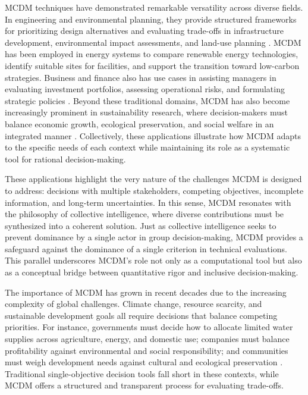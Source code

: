 MCDM techniques have demonstrated remarkable versatility across diverse fields. In engineering and environmental planning, they provide structured frameworks for prioritizing design alternatives and evaluating trade-offs in infrastructure development, environmental impact assessments, and land-use planning \cite{karakus2022,Dirie2024}. MCDM has been employed in energy systems to compare renewable energy technologies, identify suitable sites for facilities, and support the transition toward low-carbon strategies. Business and finance also has use cases in assisting managers in evaluating investment portfolios, assessing operational risks, and formulating strategic policies \cite{TAMIZ1998}. Beyond these traditional domains, MCDM has also become increasingly prominent in sustainability research, where decision-makers must balance economic growth, ecological preservation, and social welfare in an integrated manner \cite{ettazarini2021,Mardani2015}. Collectively, these applications illustrate how MCDM adapts to the specific needs of each context while maintaining its role as a systematic tool for rational decision-making.

These applications highlight the very nature of the challenges MCDM is designed to address: decisions with multiple stakeholders, competing objectives, incomplete information, and long-term uncertainties. In this sense, MCDM resonates with the philosophy of collective intelligence, where diverse contributions must be synthesized into a coherent solution\cite{Cinalli2015}. Just as collective intelligence seeks to prevent dominance by a single actor in group decision-making, MCDM provides a safeguard against the dominance of a single criterion in technical evaluations. This parallel underscores MCDM's role not only as a computational tool but also as a conceptual bridge between quantitative rigor and inclusive decision-making.   

The importance of MCDM has grown in recent decades due to the increasing complexity of global challenges. Climate change, resource scarcity, and sustainable development goals all require decisions that balance competing priorities. For instance, governments must decide how to allocate limited water supplies across agriculture, energy, and domestic use; companies must balance profitability against environmental and social responsibility; and communities must weigh development needs against cultural and ecological preservation \cite{KUMAR2017596,PortnerIPCC2022}. Traditional single-objective decision tools fall short in these contexts, while MCDM offers a structured and transparent process for evaluating trade-offs.

